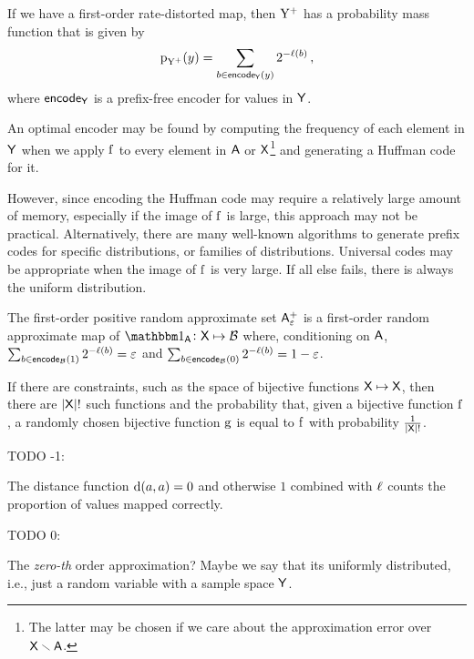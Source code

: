 \documentclass[11pt,final,hidelinks]{article}
\providecommand{\Encode}{\mathsf{encode}}
\newcommand{\BL}{\ell}  %
\begin{document}
If we have a first-order rate-distorted map, then $\mathrm{Y^{+}}$ has a probability mass function that is given by
\begin{equation}
	\Fun{p}_{\RV{Y^{+}}}(y) = \sum_{b \in \Encode_{\Set{Y}}(y)} 2^{-\BL(b)}\,,
\end{equation}
where $\Encode_{\Set{Y}}$ is a prefix-free encoder for values in $\Set{Y}$.

An optimal encoder may be found by computing the frequency of each element in $\Set{Y}$ when we apply $\Fun{f}$ to every element in $\Set{A}$ or $\Set{X}$\footnote{The latter may be chosen if we care about the approximation error over $\SetDiff[\Set{X}][\Set{A}]$.} and generating a Huffman code for it.

However, since encoding the Huffman code may require a relatively large amount of memory, especially if the image of $\Fun{f}$ is large, this approach may not be practical.
Alternatively, there are many well-known algorithms to generate prefix codes for specific distributions, or families of distributions.
Universal codes may be appropriate when the image of $\Fun{f}$ is very large.
If all else fails, there is always the uniform distribution.

\begin{example}
The first-order positive random approximate set $\PASet{A}[\fprate]$ is a first-order random approximate map of $\SetIndicator{\Set{A}} \colon \Set{X} \mapsto \BitSet$ where, conditioning on $\Set{A}$, $\sum_{b \in \Encode_{\BitSet}(1)} 2^{-\BL(b)} = \fprate$ and $\sum_{b \in \Encode_{\BitSet}(0)} 2^{-\BL(b)} = 1-\fprate$.
\end{example}



If there are constraints, such as the space of bijective functions $\Set{X} \mapsto \Set{X}$, then there are $\Card{\Set{X}}!$ such functions and the probability that, given a bijective function $\Fun{f}$, a randomly chosen bijective function $\Fun{g}$ is equal to $\Fun{f}$ with probability $\frac{1}{\Card{\Set{X}}!}$.




TODO -1:

The distance function $\Fun{d}(a,a) = 0$ and otherwise $1$ combined with $\Fun{\ell}$ counts the proportion of values mapped correctly.

TODO 0:

The \emph{zero-th} order approximation? Maybe we say that its uniformly distributed, i.e., just a random variable with a sample space $\Set{Y}$.
\end{document}
